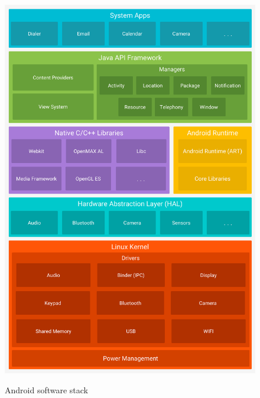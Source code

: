 \begin{figure}
  \centering
  \includegraphics[width=0.9\linewidth]{img/android}
  \caption{Android software stack}
  \label{fig:Android software stack} \autocite{Bron7IMG}
\end{figure}

